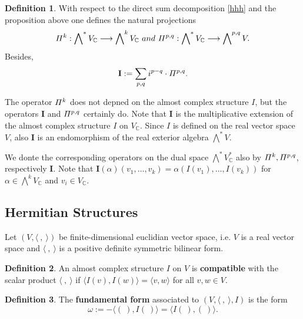 \documentclass{article}
\theoremstyle{definition}
\newtheorem{definition}{Definition}[subsection]
\theoremstyle{plain}
\begin{document}
\begin{definition}\label{rop}
    With respect to the direct sum decomposition \eqref{hhh} and the proposition above one defines the natural projections\[
        \mathnormal{\Pi}^{k}:\bigwedge\nolimits^*V_{\mathbb{C}}\longrightarrow\bigwedge\nolimits^k V_{\mathbb{C}}\ and\ \mathnormal{\Pi}^{p,q}:\bigwedge\nolimits^* V_{\mathbb{C}}\longrightarrow\bigwedge\nolimits^{p,q}V.
    \]Besides,\[
        \mathrm{\mathbf{I}}:=\sum_{p,q}i^{p-q}\cdot \mathnormal{\Pi}^{p,q}.
    \]
\end{definition}

The operator $ \mathnormal{\Pi}^{k} $ does not depned on the almost complex structure $ I $, but the operators $ \mathrm{\mathbf{I}} $ and $ \mathnormal{\Pi}^{p,q} $ certainly do. Note that $ \mathrm{\mathbf{I}} $ is the multiplicative extension of the almost complex structure $ I $ on $ V_{\mathbb{C}} $. Since $ I $ is defined on the real vector space $ V $, also $ \mathrm{\mathbf{I}} $ is an endomorphism of the real exterior algebra $ \bigwedge^* V $.

We donte the corresponding operators on the dual space $ \bigwedge^* V_{\mathbb{C}}^{*} $ also by $ \mathnormal{\Pi}^{k},\mathnormal{\Pi}^{p,q} $, respectively $ \mathrm{\mathbf{I}} $. Note that $ \mathrm{\mathbf{I}}(\alpha)(v_1,\dots,v_k)=\alpha(I(v_1),\dots,I(v_k)) $ for $ \alpha\in \bigwedge^k V_{\mathbb{C}} $ and $ v_i\in V_{\mathbb{C}} $.

\subsection{Hermitian Structures}

Let $ (V,\langle\ ,\ \rangle) $ be finite-dimensional euclidian vector space, i.e. $ V $ is a real vector space and $ \langle\ ,\ \rangle $ is a positive definite symmetric bilinear form.\

\begin{definition}
    An almost complex structure $ I $ on $ V $ is \textbf{compatible} with the scalar product $ \langle\ ,\ \rangle $ if $ \langle I(v),I(w)\rangle=\langle v,w\rangle $ for all $ v,w\in V $.
\end{definition}

\begin{definition}\label{gc}
    The \textbf{fundamental form} associated to $ (V,\langle\ ,\ \rangle,I) $ is the form\[
        \omega := -\langle(\ ),I(\ )\rangle=\langle I(\ ),(\ )\rangle.
    \]
\end{definition}
\end{document}
